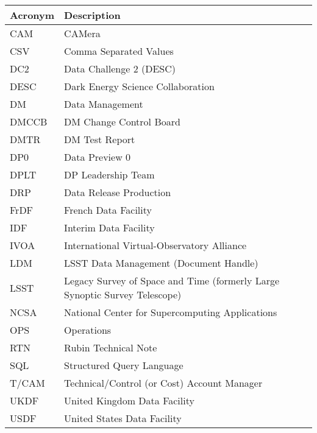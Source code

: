 \addtocounter{table}{-1}
\begin{longtable}{p{}p{}}\hline
\textbf{Acronym} & \textbf{Description}  \\\hline

CAM & CAMera \\\hline
CSV & Comma Separated Values \\\hline
DC2 & Data Challenge 2 (DESC) \\\hline
DESC & Dark Energy Science Collaboration \\\hline
DM & Data Management \\\hline
DMCCB & DM Change Control Board \\\hline
DMTR & DM Test Report \\\hline
DP0 & Data Preview 0 \\\hline
DPLT & DP Leadership Team \\\hline
DRP & Data Release Production \\\hline
FrDF & French Data Facility \\\hline
IDF & Interim Data Facility \\\hline
IVOA & International Virtual-Observatory Alliance \\\hline
LDM & LSST Data Management (Document Handle) \\\hline
LSST & Legacy Survey of Space and Time (formerly Large Synoptic Survey Telescope) \\\hline
NCSA & National Center for Supercomputing Applications \\\hline
OPS & Operations \\\hline
RTN & Rubin Technical Note \\\hline
SQL & Structured Query Language \\\hline
T/CAM & Technical/Control (or Cost) Account Manager \\\hline
UKDF & United Kingdom Data Facility \\\hline
USDF & United States Data Facility \\\hline
\end{longtable}

